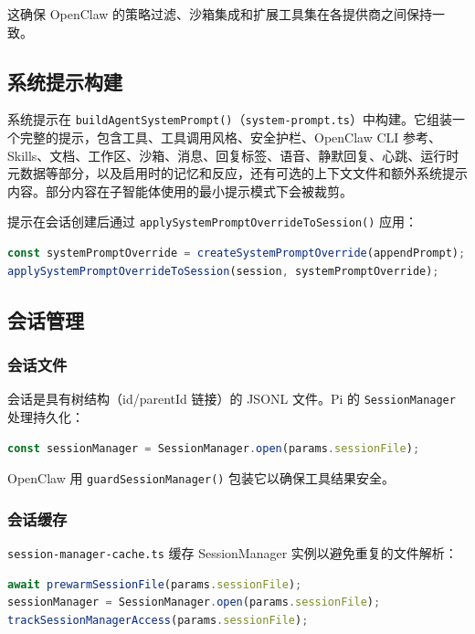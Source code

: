 这确保 OpenClaw 的策略过滤、沙箱集成和扩展工具集在各提供商之间保持一致。

\subsection{系统提示构建}


系统提示在 \texttt{buildAgentSystemPrompt()}（\texttt{system-prompt.ts}）中构建。它组装一个完整的提示，包含工具、工具调用风格、安全护栏、OpenClaw CLI 参考、Skills、文档、工作区、沙箱、消息、回复标签、语音、静默回复、心跳、运行时元数据等部分，以及启用时的记忆和反应，还有可选的上下文文件和额外系统提示内容。部分内容在子智能体使用的最小提示模式下会被裁剪。

提示在会话创建后通过 \texttt{applySystemPromptOverrideToSession()} 应用：

\begin{lstlisting}[language=typescript]
const systemPromptOverride = createSystemPromptOverride(appendPrompt);
applySystemPromptOverrideToSession(session, systemPromptOverride);
\end{lstlisting}


\subsection{会话管理}


\subsubsection{会话文件}


会话是具有树结构（id/parentId 链接）的 JSONL 文件。Pi 的 \texttt{SessionManager} 处理持久化：

\begin{lstlisting}[language=typescript]
const sessionManager = SessionManager.open(params.sessionFile);
\end{lstlisting}


OpenClaw 用 \texttt{guardSessionManager()} 包装它以确保工具结果安全。

\subsubsection{会话缓存}


\texttt{session-manager-cache.ts} 缓存 SessionManager 实例以避免重复的文件解析：

\begin{lstlisting}[language=typescript]
await prewarmSessionFile(params.sessionFile);
sessionManager = SessionManager.open(params.sessionFile);
trackSessionManagerAccess(params.sessionFile);
\end{lstlisting}


